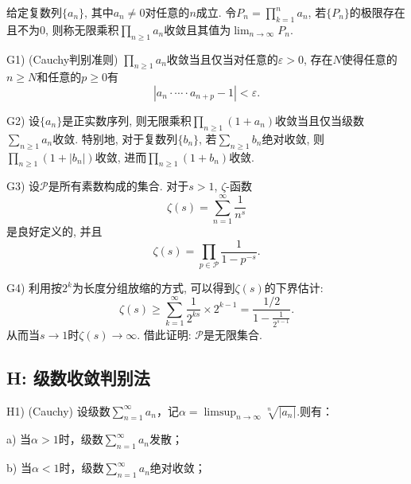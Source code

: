 
给定复数列$\{ a_n \}$, 其中$a_n \neq 0$对任意的$n$成立. 令$P_n = \prod_{k=1}^{n} a_n$, 若$\{ P_n \}$的极限存在且不为$0$, 则称无限乘积$\prod_{n \geq 1}a_n$收敛且其值为$\lim_{n \to \infty} P_n$. 

G1) (Cauchy判别准则) $\prod_{n \geq 1}a_n$收敛当且仅当对任意的$\varepsilon >0$, 存在$N$使得任意的$n \geq N$和任意的$p \geq 0$有$$|a_n \cdot \cdots \cdot a_{n+p}-1|<\varepsilon .$$

G2) 设$\{ a_n \}$是正实数序列, 则无限乘积$\prod_{n \geq 1} (1+a_n)$收敛当且仅当级数$\sum_{n\geq 1}a_n$收敛. 特别地, 对于复数列$\{ b_n \}$, 若$\sum_{n\geq 1}b_n$绝对收敛, 则$\prod_{n \geq 1} (1+|b_n|)$收敛, 进而$\prod_{n \geq 1} (1+b_n)$收敛. 

G3) 设$\mathcal{P}$是所有素数构成的集合. 对于$s>1$, $\zeta$-函数$$\zeta (s) = \sum_{n=1}^{\infty} \frac{1}{n^s}$$
是良好定义的, 并且$$\zeta (s) = \prod_{p \in \mathcal{P}} \frac{1}{1-p^{-s}}. $$

G4) 利用按$2^k$为长度分组放缩的方式, 可以得到$\zeta (s)$的下界估计: $$\zeta (s) \geq \sum_{k=1}^{\infty} \frac{1}{2^{ks}} \times 2^{k-1} = \frac{1/2}{1-\frac{1}{2^{s-1}}}.$$
从而当$s \to 1$时$\zeta (s) \to \infty$. 借此证明: $\mathcal{P}$是无限集合. 

\subsection*{H: 级数收敛判别法}


H1) (Cauchy) 设级数$\sum_{n=1}^{\infty} a_n$，记$\alpha = \limsup_{n\to \infty} \sqrt[n]{|a_n|}$.则有：
	
	a) 当$\alpha >1$时，级数$\sum_{n=1}^{\infty} a_n$发散；
	
	b) 当$\alpha <1$时，级数$\sum_{n=1}^{\infty} a_n$绝对收敛；
	
